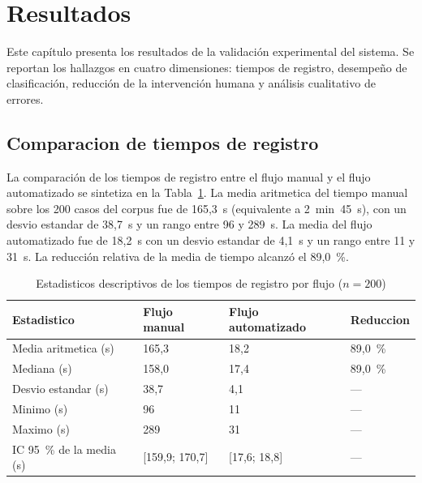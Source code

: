 \section{Resultados}

Este capítulo presenta los resultados de la validación experimental del sistema. Se reportan los hallazgos en cuatro dimensiones: tiempos de registro, desempeño de clasificación, reducción de la intervención humana y análisis cualitativo de errores.

\subsection{Comparacion de tiempos de registro}

La comparación de los tiempos de registro entre el flujo manual y el flujo automatizado se sintetiza en la Tabla~\ref{tab:tiempos}. La media aritmetica del tiempo manual sobre los 200 casos del corpus fue de 165,3~s (equivalente a 2~min~45~s), con un desvio estandar de 38,7~s y un rango entre 96 y 289~s. La media del flujo automatizado fue de 18,2~s con un desvio estandar de 4,1~s y un rango entre 11 y 31~s. La reducción relativa de la media de tiempo alcanzó el 89,0~\%.

\begin{table}[htbp]
\centering
\caption{Estadisticos descriptivos de los tiempos de registro por flujo (\(n = 200\))}
\label{tab:tiempos}
\begin{tabular}{@{}p{4.0cm} p{3.5cm} p{3.5cm} p{2.5cm}@{}}
\toprule
\textbf{Estadistico} & \textbf{Flujo manual} & \textbf{Flujo automatizado} & \textbf{Reduccion} \\
\midrule
Media aritmetica (s)      & 165,3  & 18,2  & 89,0~\% \\
Mediana (s)               & 158,0  & 17,4  & 89,0~\% \\
Desvio estandar (s)       & 38,7   & 4,1   & --- \\
Minimo (s)                & 96     & 11    & --- \\
Maximo (s)                & 289    & 31    & --- \\
IC 95~\% de la media (s) & [159,9; 170,7] & [17,6; 18,8] & --- \\
\bottomrule
\end{tabular}
\end{table}

